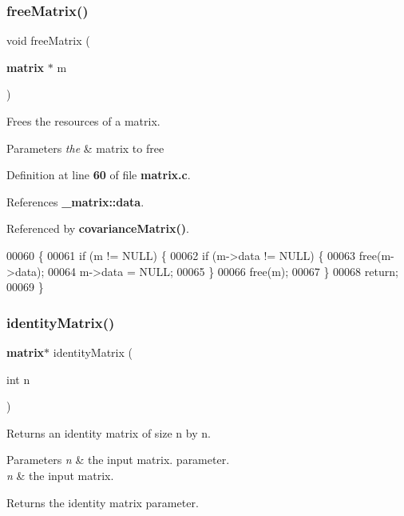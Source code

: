 \subsubsection{free\+Matrix()}
{\footnotesize\ttfamily void free\+Matrix (\begin{DoxyParamCaption}\item[{\textbf{ matrix} $\ast$}]{m }\end{DoxyParamCaption})}



Frees the resources of a matrix. 


\begin{DoxyParams}{Parameters}
{\em the} & matrix to free \\
\hline
\end{DoxyParams}


Definition at line \textbf{ 60} of file \textbf{ matrix.\+c}.



References \textbf{ \+\_\+matrix\+::data}.



Referenced by \textbf{ covariance\+Matrix()}.


\begin{DoxyCode}
00060                            \{
00061     \textcolor{keywordflow}{if} (m != NULL) \{
00062         \textcolor{keywordflow}{if} (m->data != NULL) \{
00063             free(m->data);
00064             m->data = NULL;
00065         \}
00066         free(m);
00067     \}
00068     \textcolor{keywordflow}{return};
00069 \}
\end{DoxyCode}
\mbox{\label{matrix_8h_aa3f5e409b1641373be7cf7284e216d1a}} 
\subsubsection{identity\+Matrix()}
{\footnotesize\ttfamily \textbf{ matrix}$\ast$ identity\+Matrix (\begin{DoxyParamCaption}\item[{int}]{n }\end{DoxyParamCaption})}



Returns an identity matrix of size n by n. 


\begin{DoxyParams}{Parameters}
{\em n} & the input matrix. parameter.\\
\hline
{\em n} & the input matrix. \\
\hline
\end{DoxyParams}
\begin{DoxyReturn}{Returns}
the identity matrix parameter. 
\end{DoxyReturn}


